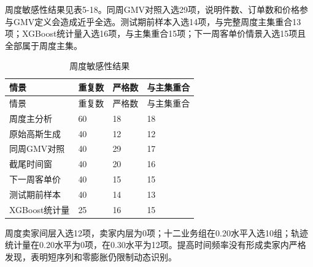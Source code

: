 \documentclass{sufethesismas}
\begin{document}
周度敏感性结果见表5-18。同周GMV对照入选29项，说明件数、订单数和价格参与GMV定义会造成近乎全选。测试期前样本入选14项，与完整周度主集重合13项；XGBoost统计量入选16项，与主集重合15项；下一周客单价情景入选15项且全部属于周度主集。

\begin{longtable}[]{@{}llll@{}}
\caption{周度敏感性结果}\tabularnewline
\toprule\noalign{}
情景 & 重复数 & 严格数 & 与主集重合 \\
\midrule\noalign{}
\endfirsthead
\toprule\noalign{}
情景 & 重复数 & 严格数 & 与主集重合 \\
\midrule\noalign{}
\endhead
\bottomrule\noalign{}
\endlastfoot
周度主分析 & 60 & 18 & 18 \\
原始高斯生成 & 40 & 12 & 12 \\
同周GMV对照 & 40 & 29 & 17 \\
截尾时间窗 & 40 & 20 & 16 \\
下一周客单价 & 40 & 15 & 15 \\
测试期前样本 & 40 & 14 & 13 \\
XGBoost统计量 & 25 & 16 & 15 \\
\end{longtable}

周度卖家间层入选12项，卖家内层为0项；十二业务组在0.20水平入选10组；轨迹统计量在0.20水平为0项，在0.30水平为12项。提高时间频率没有形成卖家内严格发现，表明短序列和零膨胀仍限制动态识别。
\end{document}
